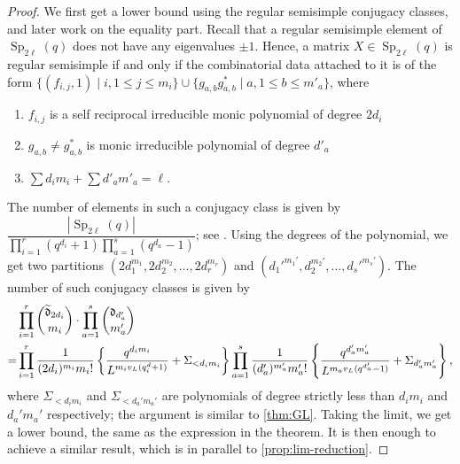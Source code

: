 \documentclass[11pt,twoside]{amsart}
\renewcommand{\d}{\mathfrak d}
\newcommand{\Sp}{\operatorname{Sp}}
\theoremstyle{definition} %
\begin{document}
\begin{proof}
We first get a lower bound using the regular semisimple conjugacy classes, and later work on the equality part.
    Recall that a regular semisimple element of $\Sp_{2\ell}(q)$ does not have any eigenvalues $\pm 1$.
    Hence, a matrix $X\in \Sp_{2\ell}(q)$ is regular semisimple if and only if the combinatorial data attached to it is of the form $\{(f_{i,j},1)\mid i,1\leq j\leq m_i\}\cup\{g_{a,b}g^*_{a,b}\mid a,1\leq b\leq m'_a\}$, where
    \begin{enumerate}
        \item $f_{i,j}$ is a self reciprocal irreducible monic polynomial of degree $2d_i$
        \item $g_{a,b}\neq g_{a,b}^*$ is monic irreducible polynomial of degree $d'_a$
        \item $\sum\limits d_im_i +\sum d'_am'_a=\ell$.
    \end{enumerate}
    The number of elements in such a conjugacy class is given by $\dfrac{|\Sp_{2\ell}(q)|}{\prod\limits_{i=1}^{r}(q^{d_i}+1)\prod\limits_{a=1}^s(q^{d_a}-1)}$; see \cite[page 36]{Wall1963}.
    Using the degrees of the polynomial, we get two partitions $(2d_1^{m_1},2d_2^{m_2},\ldots, 2d_r^{m_r})$ and $(d_1'^{m_1'},d_2^{m_2'},\ldots,d_{s}'^{m_s'})$. 
    The number of such conjugacy classes is given by 
    \begin{align*}
        &\prod\limits_{i=1}^{r}\dbinom{\widetilde{\d}_{2d_i}}{m_i}\cdot\prod\limits_{a=1}^{s}\dbinom{\d_{d'_a}}{m_a'}\\
        =&\prod\limits_{i=1}^{r}\dfrac{1}{(2d_i)^{m_i}m_i!}\left\{\dfrac{q^{d_im_i}}{L^{m_iv_L(q^d_i+1)}}+\Sigma_{<d_im_i}\right\}\prod\limits_{a=1}^{s}\dfrac{1}{(d_a')^{m_a'}m_a'!}\left\{\dfrac{q^{d_a'm_a'}}{L^{m_av_L(q^{d_a'}-1)}}+\Sigma_{d_a'm_a'}\right\},
    \end{align*}
    where $\Sigma_{<d_im_i}$ and $\Sigma_{<d_a'm_a'}$ are polynomials of degree strictly less than $d_im_i$ and $d_a'm_a'$ respectively; the argument is similar to \cref{thm:GL}. Taking the limit, we get a lower bound, the same as the expression in the theorem. It is then enough to achieve a similar result, which is in parallel to \cref{prop:lim-reduction}.


\end{proof}
\end{document}
